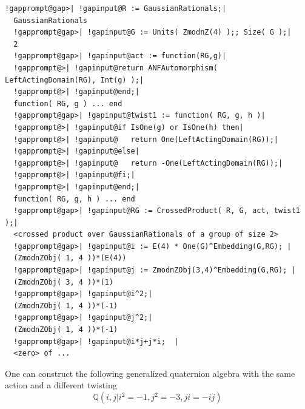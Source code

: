 \documentclass[a4paper,11pt]{report}
\begin{document}
{{{ 
\begin{Verbatim}[commandchars=!@|,fontsize=\small,frame=single,label=Example]
  !gapprompt@gap>| !gapinput@R := GaussianRationals;|
  GaussianRationals
  !gapprompt@gap>| !gapinput@G := Units( ZmodnZ(4) );; Size( G );|
  2
  !gapprompt@gap>| !gapinput@act := function(RG,g)|
  !gapprompt@>| !gapinput@return ANFAutomorphism( LeftActingDomain(RG), Int(g) );|
  !gapprompt@>| !gapinput@end;|
  function( RG, g ) ... end
  !gapprompt@gap>| !gapinput@twist1 := function( RG, g, h )|
  !gapprompt@>| !gapinput@if IsOne(g) or IsOne(h) then|
  !gapprompt@>| !gapinput@   return One(LeftActingDomain(RG));|
  !gapprompt@>| !gapinput@else|
  !gapprompt@>| !gapinput@   return -One(LeftActingDomain(RG));|
  !gapprompt@>| !gapinput@fi;|
  !gapprompt@>| !gapinput@end;|
  function( RG, g, h ) ... end
  !gapprompt@gap>| !gapinput@RG := CrossedProduct( R, G, act, twist1 );|
  <crossed product over GaussianRationals of a group of size 2>
  !gapprompt@gap>| !gapinput@i := E(4) * One(G)^Embedding(G,RG); |
  (ZmodnZObj( 1, 4 ))*(E(4))
  !gapprompt@gap>| !gapinput@j := ZmodnZObj(3,4)^Embedding(G,RG); |
  (ZmodnZObj( 3, 4 ))*(1)
  !gapprompt@gap>| !gapinput@i^2;|
  (ZmodnZObj( 1, 4 ))*(-1)
  !gapprompt@gap>| !gapinput@j^2;|
  (ZmodnZObj( 1, 4 ))*(-1)
  !gapprompt@gap>| !gapinput@i*j+j*i;  |
  <zero> of ...
\end{Verbatim}
 One can construct the following generalized quaternion algebra with the same
action and a different twisting 
\[ {\ensuremath{\mathbb Q}} (i,j|i^2=-1,j^2=-3,ji=-ij) \]
 
}}}
\end{document}
